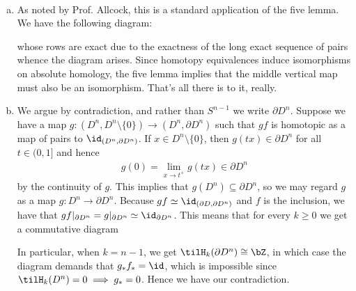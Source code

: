 \begin{homework}[e]
\begin{enumerate}[(a)]
  \end{enumerate}
  \begin{prf}$ $
    \begin{enumerate}[(a)]
      \item As noted by Prof. Allcock, this is a standard application of the five lemma. We have the following diagram:
        \begin{center}
        \end{center}
        whose rows are exact due to the exactness of the long exact sequence of pairs whence the diagram arises. Since homotopy equivalences induce isomorphisms on absolute homology, the five lemma implies that the middle vertical map must also be an isomorphism. That's all there is to it, really.

      \item We argue by contradiction, and rather than $S^{n-1}$ we write $\partial D^n$. Suppose we have a map $g:(D^n,D^n \setminus \{0\})\to (D^n,\partial D^n)$ such that $gf$ is homotopic as a map of pairs to $\id_{(D^n,\partial D^n)}$. If $x \in D^{n}\setminus \{0\}$, then $g(tx) \in \partial D^n$ for all $t \in (0,1]$ and hence
        \begin{align*}
          g(0) = \lim_{x\to t^+} g(tx) \in \partial D^n
        \end{align*}
        by the continuity of $g$. This implies that $g(D^n) \subseteq \partial D^n$, so we may regard $g$ as a map $g:D^n \to \partial D^n$. Because $gf \simeq \id_{(\partial D, \partial D^n)}$ and $f$ is the inclusion, we have that $gf|_{\partial D^n} = g|_{\partial D^n} \simeq \id_{\partial D^n}$. This means that for every $k\geq 0$ we get a commutative diagram
        \begin{center}
        \end{center}
        In particular, when $k = n-1$, we get $\tilH_k(\partial D^n)\cong \bZ$, in which case the diagram demands that $g_*f_* = \id$, which is impossible since $\tilH_k(D^n) = 0 \implies g_* = 0$. Hence we have our contradiction.
    \end{enumerate}
  \end{prf}
\end{homework}
